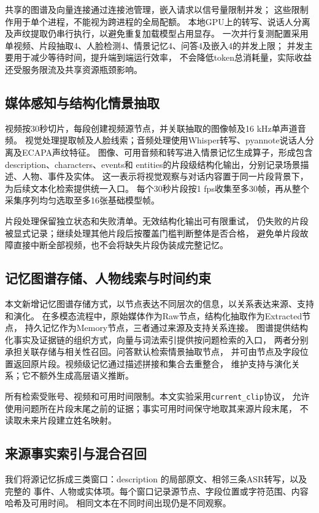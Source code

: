 \documentclass[UTF8,a4paper,11pt,fontset=fandol]{ctexart}
\DeclareRobustCommand{\code}[1]{\nolinkurl{#1}}
\begin{document}
共享的图谱及向量连接通过连接池管理，嵌入请求以信号量限制并发；
这些限制作用于单个进程，不能视为跨进程的全局配额。
本地GPU上的转写、说话人分离及声纹提取仍串行执行，以避免重复加载模型占用显存。
一次并行复测配置采用单视频、片段抽取4、人脸检测4、情景记忆4、问答4及嵌入4的并发上限；
并发主要用于减少等待时间，提升端到端运行效率，
不会降低token总消耗量，实际收益还受服务限流及共享资源瓶颈影响。

\subsection{媒体感知与结构化情景抽取}
视频按30秒切片，每段创建视频源节点，并关联抽取的图像帧及16 kHz单声道音频。
视觉处理提取帧及人脸线索；音频处理使用Whisper转写、pyannote说话人分离及ECAPA声纹特征。
图像、可用音频和转写进入情景记忆生成算子，形成包含description、characters、events和
entities的片段级结构化输出，分别记录场景描述、人物、事件及实体。
这一表示将视觉观察与对话内容置于同一片段背景下，为后续文本化检索提供统一入口。
每个30秒片段按1 fps收集至多30帧，再从整个采集序列均匀选取至多16张基础模型帧。

片段处理保留独立状态和失败清单。无效结构化输出可有限重试，
仍失败的片段被显式记录；继续处理其他片段后按覆盖门槛判断整体是否合格，
避免单片段故障直接中断全部视频，也不会将缺失片段伪装成完整记忆。

\subsection{记忆图谱存储、人物线索与时间约束}
本文新增记忆图谱存储方式，以节点表达不同层次的信息，以关系表达来源、支持和演化。
在多模态流程中，原始媒体作为Raw节点，结构化抽取作为Extracted节点，
持久记忆作为Memory节点，三者通过来源及支持关系连接。
图谱提供结构化事实及证据链的组织方式，向量与词法索引提供按问题检索的入口，
两者分别承担关联存储与相关性召回。问答默认检索情景抽取节点，
并可由节点及字段位置返回原片段。视频级记忆通过描述拼接和集合去重整合，
维护支持与演化关系；它不额外生成高层语义推断。

所有检索受账号、视频和可用时间限制。本文实验采用\code{current_clip}协议，
允许使用问题所在片段末尾之前的证据；事实可用时间保守地取其来源片段末尾，
不读取未来片段建立姓名映射。

\subsection{来源事实索引与混合召回}
我们将源记忆拆成三类窗口：description 的局部原文、相邻三条ASR转写，以及完整的
事件、人物或实体项。每个窗口记录源节点、字段位置或字符范围、内容哈希及可用时间。
相同文本在不同时间出现仍是不同观察。
\end{document}
